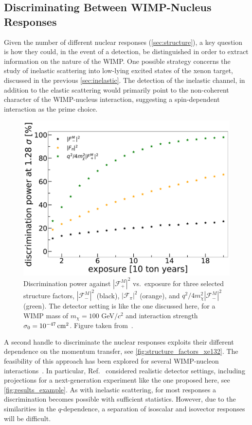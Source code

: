 \subsection{Discriminating Between WIMP-Nucleus Responses}

Given the number of different nuclear responses (\autoref{sec:structure}), a key question is how they could, in the event of a detection, be distinguished in order to extract information on the nature of the WIMP. One possible strategy concerns the study of inelastic scattering into low-lying excited states of the xenon target, discussed in the previous \autoref{sec:inelastic}. The detection of the inelastic channel, in addition to the elastic scattering would primarily point to the non-coherent character of the WIMP-nucleus interaction, suggesting a spin-dependent interaction as the prime choice.

\begin{figure}[!htbp] 
	\centering
	\includegraphics[width=\columnwidth]{fig_results_exp_new_leg.pdf}
	\caption{Discrimination power against $|\mathcal{F}_+^M|^2$ vs.\ exposure for three selected structure factors, $|\mathcal{F}_-^M|^2$ (black), $|\mathcal{F}_\pi|^2$ (orange), and $q^2/4m_\chi^2 |\mathcal{F}_-^M|^2$ (green). 
	The detector setting is like the one discussed here, for a WIMP mass of $m_\chi =100$ GeV$/c^2$ and interaction strength $\sigma_0=10^{-47}\,{\rm cm}^2$. Figure taken from~\cite{Fieguth:2018vob}.} 
	\label{fig:results_example}
\end{figure}

A second handle to discriminate the nuclear responses exploits their different dependence on the momentum transfer, see \autoref{fig:structure_factors_xe132}. The feasibility of this approach has been explored for several WIMP-nucleon interactions~\cite{Fieguth:2018vob,Rogers:2016jrx}. In particular, Ref.~\cite{Fieguth:2018vob} considered realistic detector settings, including projections for a next-generation experiment like the one proposed here, see \autoref{fig:results_example}. As with inelastic scattering, for most responses a discrimination becomes possible with sufficient statistics. However, due to the similarities in the $q$-dependence, a separation of isoscalar and isovector responses will be difficult.

